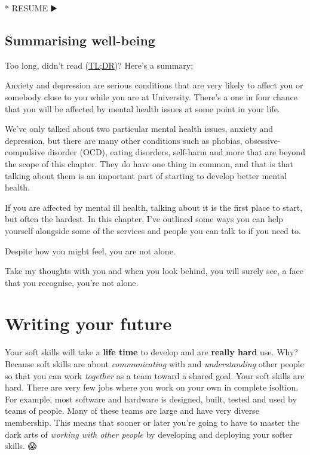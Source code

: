 \documentclass[
]{book}
\newenvironment{Shaded}{\begin{snugshade}}{\end{snugshade}}
\newcommand{\NormalTok}[1]{#1}
\newcommand{\SpecialStringTok}[1]{\textcolor[rgb]{0.31,0.60,0.02}{#1}}
\begin{document}
\begin{Shaded}
\begin{Highlighting}[]
\SpecialStringTok{* }\NormalTok{RESUME ▶️}
\end{Highlighting}
\end{Shaded}

\hypertarget{tldr3}{%
\section{Summarising well-being}\label{tldr3}}

Too long, didn't read (\href{https://en.wiktionary.org/wiki/too_long;_didn\%27t_read}{TL;DR})? Here's a summary:

Anxiety and depression are serious conditions that are very likely to affect you or somebody close to you while you are at University. There's a one in four chance that you will be affected by mental health issues at some point in your life.

We've only talked about two particular mental health issues, anxiety and depression, but there are many other conditions such as phobias, obsessive-compulsive disorder (OCD), eating disorders, self-harm and more that are beyond the scope of this chapter. They do have one thing in common, and that is that talking about them is an important part of starting to develop better mental health.

If you are affected by mental ill health, talking about it is the first place to start, but often the hardest. In this chapter, I've outlined some ways you can help yourself alongside some of the services and people you can talk to if you need to.

Despite how you might feel, you are not alone.

Take my thoughts with you and when you look behind, you will surely see, a face that you recognise, you're not alone. \citep{yourenotalone}

\hypertarget{writing}{%
\chapter{Writing your future}\label{writing}}

Your soft skills will take a \textbf{life time} to develop and are \textbf{really hard} use. Why? Because soft skills are about \emph{communicating} with and \emph{understanding} other people so that you can work \emph{together} as a team toward a shared goal. Your soft skills are hard. There are very few jobs where you work on your own in complete isoltion. For example, most software and hardware is designed, built, tested and used by teams of people. Many of these teams are large and have very diverse membership. This means that sooner or later you're going to have to master the dark arts of \emph{working with other people} by developing and deploying your softer skills. 😱
\end{document}
